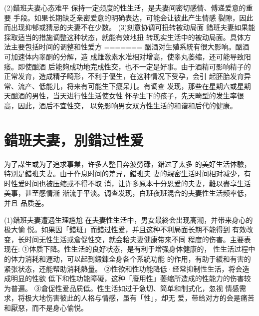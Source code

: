 \documentclass[12pt,UTF8]{ctexbook}
\begin{document}
(2)錯班夫妻心态难平
保持一定频度的性生活，是夫妻间密切感情、傅递爱意的重要
手段。如果长期缺乏亲密爱意的明确表达，可能会让彼此产生情感
裂隙，因此而出现抑郁或猜忌的夫妻不在少数。
(3)刻意协调可扭转被动局面
錯班夫妻如果能採取适当的措施调整这种状态，就能有效地扭
转现实生活中的被动局面。具体方法主要包括时间的调整和性爱方
=======
酗酒对生殖系統有很大影响。酗酒可加速体内睾酮的分解，造
成雌激素水准相对增高，使睾丸萎缩，还可能导致阳痿。即使酗酒
后能夠成功地完成性交，也不一定是好事。由于酒精可影响精子的
正常发育，造成精子畸形，不利于優生，在这种情况下受孕，会引
起胚胎发育异常、流产、低能儿，将来有可能生下癡呆儿。有调查
发现，那些在星期六或星期天酗酒的男性，当天进行性生活使女性
怀孕生下的孩子，先天畸型的发生率很高，因此，酒后不宜性交，
以免影响男女双方性生活的和谐和后代的健康。

\section{錯班夫妻，別錯过性爱}

为了謀生或为了追求事業，许多人整日奔波勞碌，錯过了太多
的美好生活体驗，特別是錯班夫妻。由于作息时间的差异，錯班夫
妻的親密生活时间相对减少，有时性爱时间也被压缩或不得不取
消，让许多原本十分恩爱的夫妻，難以盡享生活美事，甚至感情漸
漸流于平淡。调查发现，白班夜班混合的夫妻性生活频率低，并且
品质差。

(1)錯班夫妻遭遇生理尴尬
在夫妻性生活中，男女最終会出现高潮，并带来身心的极大愉
悦。如果因「錯班」而錯过性爱，并且这种不利局面长期不能得到
有效改变，长时间无性生活或倉促性交，就会耠夫妻健康带来不同
程度的伤害。主要表现在:
①体质下降。性生活的良好状态，是有利于增强身体健康的，
性生活过程中的体力消耗和運动，可以起到鍛鍊全身各个系統功能
的作用，有助于緩和有害的紧张状态，还能帮助消耗熱量。
②性欲和性功能降低·经常抑制性生活，将会造成明显的性欲
低下和性功能障礙，这种「廢用性」萎缩所造成的性能力的伤害较
为普遍。
③倉促性爱品质低。性生活如过于急切、简单和制式化，忽视
情感需求，将极大地伤害彼此的人格与情感，虽有「性」，却无
爱，带给对方的会是痛苦和厭惡，而不是身心愉悦。
\end{document}
